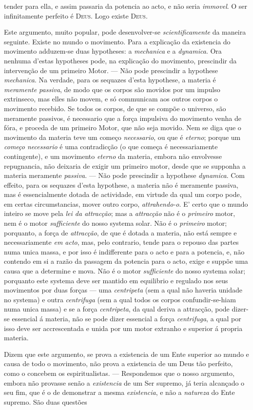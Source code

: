 tender para ella, e assim passaria da potencia ao acto, e não seria \emph{immovel}. O ser infinitamente perfeito é \textsc{Deus}. Logo existe \textsc{Deus}.\par Este argumento, muito popular, pode desenvolver-se \emph{scientificamente} da maneira seguinte. Existe no mundo o movimento. Para a explicação da existencia do movimento adduzem-se duas hypotheses: a \emph{mechanica} e a \emph{dynamica}. Ora nenhuma d'estas hypotheses pode, na explicação do movimento, prescindir da intervenção de um primeiro Motor. --- Não pode prescindir a hypothese \emph{mechanica}. Na verdade, para os sequazes d'esta hypothese, a materia é \emph{meramente passiva}, de modo que os corpos são movidos por um impulso extrinseco, mas elles não movem, e só communicam aos outros corpos o movimento recebido. Se todos os corpos, de que se compõe o universo, são meramente passivos, é necessario que a força impulsiva do movimento venha de fóra, e proceda de um primeiro Motor, que não seja movido. Nem se diga que o movimento da materia teve um começo \emph{necessario}, ou que é \emph{eterno}; porque um \emph{começo necessario} é uma contradicção (o que começa é necessariamente contingente), e um movimento \emph{eterno} da materia, embora não envolvesse repugnancia, não deixaria de exigir um primeiro motor, desde que se supponha a materia meramente \emph{passiva}. --- Não pode prescindir a hypothese \emph{dynamica}. Com effeito, para os sequazes d'esta hypothese, a materia não é meramente passiva, mas é essencialmente dotada de actividade, em virtude da qual um corpo pode, em certas circumstancias, mover outro corpo, \emph{attrahendo-o}. E' certo que o mundo inteiro se move pela \emph{lei da attracção}; mas a \emph{attracção} não é o \emph{primeiro} motor, nem é o motor \emph{sufficiente} do nosso systema solar. Não é o \emph{primeiro} motor; porquanto, a força de \emph{attracção}, de que é dotada a materia, não está sempre e necessariamente \emph{em acto}, mas, pelo contrario, tende para o repouso das partes numa unica massa, e por isso é indifferente para o acto e para a potencia, e, não contendo em si a razão da passagem da potencia para o acto, exige e suppõe uma causa que a determine e mova. Não é o motor \emph{sufficiente} do nosso systema solar; porquanto este systema deve ser mantido em equilibrio e regulado nos seus movimentos por duas forças --- uma \emph{centripeta} (sem a qual não haveria unidade no systema) e outra \emph{centrifuga} (sem a qual todos os corpos confundir-se-hiam numa unica massa) e se a força \emph{centripeta}, da qual deriva a attracção, pode dizer-se essencial á materia, não se pode dizer essencial a força \emph{centrifuga}, a qual por isso deve ser accrescentada e unida por um motor extranho e superior á propria materia.\par Dizem que este argumento, se prova a existencia de um Ente superior ao mundo e causa de todo o movimento, não prova a existencia de um Deus tão perfeito, como o concebem os espiritualistas. --- Respondemos que o nosso argumento, embora não provasse senão a \emph{existencia} de um Ser supremo, já teria alcançado o seu fim, que é o de demonstrar a mesma \emph{existencia}, e não a \emph{natureza} do Ente supremo. São duas questões 
